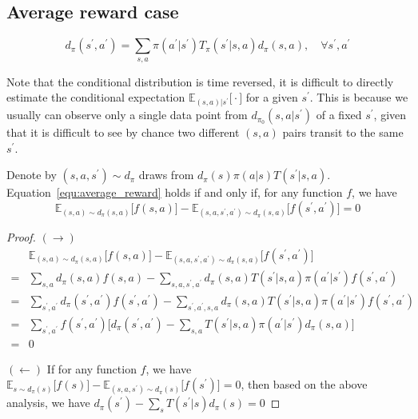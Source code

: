 \subsection{Average reward case}
\begin{equation}\label{equ:average_reward}
d_{\pi}(s^\prime, a^\prime) = \sum_{s, a} \pi(a^\prime|s^\prime) T_{\pi}(s^\prime|s, a) d_{\pi}(s, a), \quad \forall s^\prime, a^\prime
\end{equation}

Note that the conditional distribution is time reversed, it is difficult to directly estimate the conditional expectation $\mathbb{E}_{(s, a)|s^\prime}\big[\cdot\big]$ for a given $s^\prime$. This is because we usually can observe only a single data point from $d_{\pi_0}(s, a|s^\prime)$ of a fixed $s^\prime$, given that it is difficult to see by chance two different $(s, a)$ pairs transit to the same $s^\prime$.


\begin{lemma} Denote by $(s, a, s^\prime)\sim d_{\pi}$ draws from $d_{\pi}(s)\pi(a|s)T(s^\prime|s, a)$. Equation~\ref{equ:average_reward} holds if and only if, for any function $f$, we have
\begin{equation}
\mathbb{E}_{(s,a)\sim d_{\pi}(s,a)}\big[ f(s,a) \big] - \mathbb{E}_{(s, a, s^\prime,a^\prime) \sim d_{\pi}(s,a)}\big[ f(s^\prime,a^\prime) \big] = 0
\end{equation}
\end{lemma}

\begin{proof}
$(\rightarrow)$
\begin{align*}
&\mathbb{E}_{(s, a)\sim d_{\pi}(s, a)}\big[ f(s, a) \big] - \mathbb{E}_{(s, a, s^\prime, a^\prime) \sim d_{\pi}(s, a)}\big[ f(s^\prime, a^\prime) \big] \\
= & \sum_{s, a} d_{\pi}(s, a)f(s, a) - \sum_{s,a,s^\prime,a^\prime} d_{\pi}(s, a)T(s^\prime|s, a)\pi(a^\prime|s^\prime) f(s^\prime, a^\prime) \\
= & \sum_{s^\prime, a^\prime}d_{\pi}(s^\prime, a^\prime)f(s^\prime, a^\prime) - \sum_{s^\prime,a^\prime,s,a} d_{\pi}(s, a)T(s^\prime|s, a)\pi(a^\prime|s^\prime)f(s^\prime, a^\prime) \\
= & \sum_{s^\prime,a^\prime} f(s^\prime,a^\prime) \big[ d_{\pi}(s^\prime,a^\prime) - \sum_{s,a}T(s^\prime|s,a)\pi(a^\prime|s^\prime) d_{\pi}(s,a) \big] \\
= & 0
\end{align*}

$(\leftarrow)$
If for any function $f$, we have
$\mathbb{E}_{s\sim d_{\pi}(s)}\big[ f(s) \big] - \mathbb{E}_{(s, a, s^\prime) \sim d_{\pi}(s)}\big[ f(s^\prime) \big] = 0$, then based on the above analysis, we have $d_{\pi}(s^\prime) - \sum_{s}T(s^\prime|s) d_{\pi}(s) =0 $
\end{proof}

